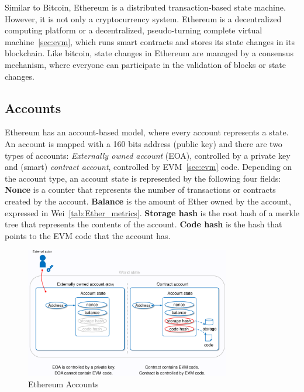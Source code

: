 \documentclass[11pt,a4paper]{report}
\begin{document}
Similar to Bitcoin, Ethereum\cite{article:eth}\cite{book:masteringETH} is a distributed transaction-based state machine. However, it is not only a cryptocurrency system. Ethereum is a decentralized computing platform or a decentralized, pseudo-turning complete virtual machine~\ref{sec:evm}, which runs smart contracts and stores its state changes in its blockchain. Like bitcoin, state changes in Ethereum are managed by a consensus mechanism, where everyone can participate in the validation of  blocks or state changes.

\subsection{Accounts}\label{sec:accounts}
Ethereum\cite{article:eth}\cite{wood2014ethereum} has an account-based model, where every account represents a state. An account is mapped with a 160 bits address (public key) and there are two types of accounts: \textit{Externally owned account} (EOA), controlled by a private key and (smart) \textit{contract account}, controlled by EVM~\ref{sec:evm} code. Depending on the account type, an account state is represented by the following four fields: \textbf{Nonce} is a counter that represents the number of transactions or contracts created by the account. \textbf{Balance} is the amount of Ether owned by the account, expressed in Wei~\ref{tab:Ether_metrics}. \textbf{Storage hash} is the root hash of a merkle tree that represents the contents of the account. \textbf{Code hash} is the hash that points to the EVM code that the account has.
\begin{figure}[htp]
	\centering
	\includegraphics[width=0.8\textwidth]{./images/accounts}
	\caption{Ethereum Accounts\cite{evm-illustrate}}
	\label{fig:accounts}
\end{figure}
\end{document}
